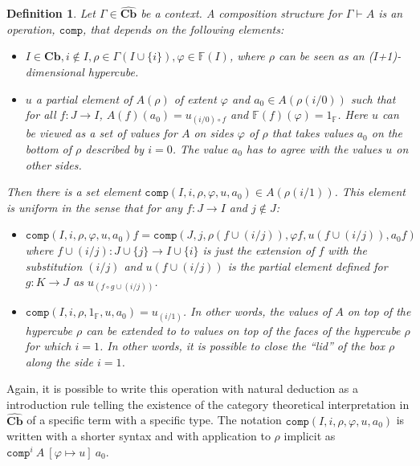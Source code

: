 \documentclass[12pt,a4paper,twoside,xetex]{book} %
\newcommand{\keyword}[1]{\emph{#1}\index{#1}}
\newtheorem{definition}[theorem]{Definition}
\newcommand{\psh}[1]{\widehat{#1}}
\newcommand{\op}[1]{\mathtt{#1}}
\newcommand{\cube}[0]{\textbf{Cb}}
\newcommand{\compt}[5]{\op{comp}^{#1} \ {#2} \ \left[{#3} \mapsto {#4} \right] \ {#5}}
\begin{document}
\begin{definition}\label{compdef}
Let $\Gamma \in \psh{\cube}$ be a context. A \keyword{composition structure} for $\Gamma \vdash A$ is an operation, 
$\op{comp}$, that depends on the following elements:

\begin{itemize}
\item $I \in \cube, i \not \in I, \rho \in \Gamma(I \cup \{i\}), \varphi 
\in \mathbb{F}(I)$, where $\rho$ can be seen as an ($I$+1)-dimensional 
hypercube.
\item $u$ a partial element of $A(\rho)$ of extent $\varphi$ and $a_0 \in 
A(\rho (i/0))$ such that for all $f:J\rightarrow I$, $A(f)(a_0) = u _{(i/0) 
\circ f}$ and $\mathbb{F}(f)(\varphi) = 1_{\mathbb{F}}$. Here $u$ can be viewed 
as a set of values for $A$ on sides $\varphi$ of $\rho$ that takes values $a_0$ 
on the bottom of $\rho$ described by $i=0$. The value $a_0$ has to agree with 
the values $u$ on other sides.
\end{itemize}

Then there is a set element $\op{comp}(I,i,\rho,\varphi, u,a_0)\in 
A(\rho(i/1))$. This element is uniform in the sense that for any $f:J 
\rightarrow I$ and $j \not \in J$: 

\begin{itemize}
\item $\op{comp} \left(I,i,\rho,\varphi, u , a_0 \right) f = 
\op{comp}(J,j,\rho(f \cup (i/j)), \varphi f, u(f \cup (i/j)), a_0 f)$  where $f 
\cup (i/j): J \cup \{j\} \rightarrow I \cup \{i\}$ is just the extension of $f$ 
with the substitution $(i/j)$ and $u(f \cup (i/j))$ is the partial element 
defined for $g: K \rightarrow J$ as $u_{(f \circ g \cup (i/j))}$.

\item $\op{comp}(I,i,\rho, 1_{\mathbb{F}}, u, a_0) = u_{(i/1)}$. In other 
words, the values of $A$ on top of the hypercube $\rho$ can be extended to to 
values on top of the faces of the hypercube $\rho$ for which $i=1$. In other 
words, it is possible to close the ``lid'' of the box $\rho$ along the side 
$i=1$.

\end{itemize}



\end{definition}



Again, it is possible to write this operation with natural deduction as a introduction rule telling the 
existence of the category theoretical interpretation in $\psh{\cube}$ of a specific 
term with a specific type. The notation $\op{comp}(I,i,\rho, \varphi, u, a_0)$ 
is written with a shorter syntax and with application to $\rho$ implicit as 
$\compt{i}{A}{\varphi}{u}{a_0}$.
\end{document}
